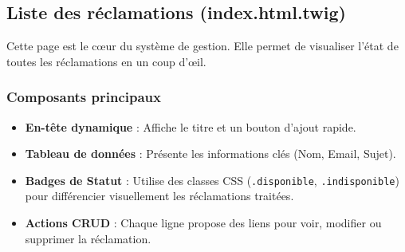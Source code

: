 \documentclass[12pt,a4paper]{article}
\begin{document}
\subsection{Liste des réclamations (index.html.twig)}
Cette page est le cœur du système de gestion. Elle permet de visualiser l'état de toutes les réclamations en un coup d'œil.

\subsubsection{Composants principaux}
\begin{itemize}
    \item \textbf{En-tête dynamique} : Affiche le titre et un bouton d'ajout rapide.
    \item \textbf{Tableau de données} : Présente les informations clés (Nom, Email, Sujet).
    \item \textbf{Badges de Statut} : Utilise des classes CSS (\texttt{.disponible}, \texttt{.indisponible}) pour différencier visuellement les réclamations traitées.
    \item \textbf{Actions CRUD} : Chaque ligne propose des liens pour voir, modifier ou supprimer la réclamation.
\end{itemize}
\end{document}
